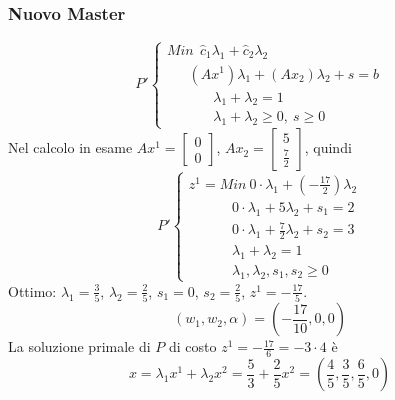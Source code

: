 \clearpage
\subsubsection{Nuovo Master}
\begin{equation*}
	P'
	\begin{cases}
		Min\ \ \hat{c}_{1}\lambda_{1}+\hat{c}_{2}\lambda_{2}\\
		\ \ \ \ \ \ \ (Ax^{1})\lambda_{1}+(Ax_{2})\lambda_{2}+s=b \\
		\ \ \ \ \ \ \ \ \ \ \ \ \ \ \ \lambda_{1}+\lambda_{2}=1 \\
		\ \ \ \ \ \ \ \ \ \ \ \ \ \ \ \lambda_{1}+\lambda_{2}\ge 0,\ s\ge 0
	\end{cases}
\end{equation*}
Nel calcolo in esame $Ax^{1}=\begin{bmatrix}0\\0\end{bmatrix}$, $Ax_{2}=\begin{bmatrix}5\\\frac{7}{2}\end{bmatrix}$, quindi
\begin{equation*}
	P'
	\begin{cases}
		z^{1}=Min\ 0\cdot\lambda_{1}+(-\frac{17}{2})\lambda_{2} \\
		\ \ \ \ \ \ \ \ \ \ \ \ \ \ 0\cdot\lambda_{1}+5\lambda_{2}+s_{1}=2 \\
		\ \ \ \ \ \ \ \ \ \ \ \ \ \ 0\cdot\lambda_{1}+\frac{7}{2}\lambda_{2}+s_{2}=3 \\
		\ \ \ \ \ \ \ \ \ \ \ \ \ \ \lambda_{1}+\lambda_{2}=1 \\
		\ \ \ \ \ \ \ \ \ \ \ \ \ \ \lambda_{1},\lambda_{2},s_{1},s_{2}\ge 0
	\end{cases}
\end{equation*}
Ottimo: $\lambda_{1}=\frac{3}{5}$, $\lambda_{2}=\frac{2}{5}$, $s_{1}=0$, $s_{2}=\frac{2}{5}$, $z^{1}=-\frac{17}{5}$.
\begin{equation*}
	(w_{1},w_{2},\alpha)=(-\frac{17}{10},0,0)
\end{equation*}
La soluzione primale di $P$ di costo $z^{1}=-\frac{17}{6}=-3\cdot 4$ è
\begin{equation*}
	x=\lambda_{1}x^{1}+\lambda_{2}x^{2}=\frac{5}{3}+\frac{2}{5}x^{2}=(\frac{4}{5},\frac{3}{5},\frac{6}{5},0)
\end{equation*}

